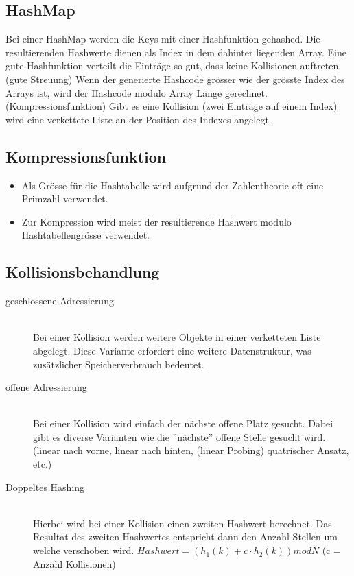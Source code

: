 \subsection{HashMap}
Bei einer HashMap werden die Keys mit einer Hashfunktion gehashed. Die resultierenden Hashwerte dienen als Index in dem dahinter liegenden Array. Eine gute Hashfunktion verteilt die Einträge so gut, dass keine Kollisionen auftreten. (gute Streuung) Wenn der generierte Hashcode grösser wie der grösste Index des Arrays ist, wird der Hashcode modulo Array Länge gerechnet. (Kompressionsfunktion) Gibt es eine Kollision (zwei Einträge auf einem Index) wird eine verkettete Liste an der Position des Indexes angelegt. 

\subsection{Kompressionsfunktion}
\begin{itemize}
	\item Als Grösse für die Hashtabelle wird aufgrund der Zahlentheorie oft eine Primzahl verwendet.
	\item Zur Kompression wird meist der resultierende Hashwert modulo Hashtabellengrösse verwendet.
\end{itemize}

\subsection{Kollisionsbehandlung}
\begin{description}
	\item[geschlossene Adressierung] \hfill \\ Bei einer Kollision werden weitere Objekte in einer verketteten Liste abgelegt. Diese Variante erfordert eine weitere Datenstruktur, was zusätzlicher Speicherverbrauch bedeutet.
	\item[offene Adressierung] \hfill \\ Bei einer Kollision wird einfach der nächste offene Platz gesucht. Dabei gibt es diverse Varianten wie die ''nächste'' offene Stelle gesucht wird. (linear nach vorne, linear nach hinten, (linear Probing) quatrischer Ansatz, etc.)
	\item[Doppeltes Hashing] \hfill \\
	Hierbei wird bei einer Kollision einen zweiten Hashwert berechnet. Das Resultat des zweiten Hashwertes entspricht dann den Anzahl Stellen um welche verschoben wird. $Hashwert = (h_1(k) + c\cdot h_2(k)) mod N$ (c = Anzahl Kollisionen)
\end{description}

